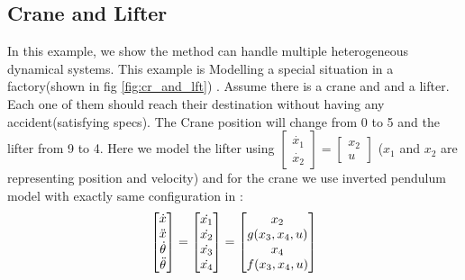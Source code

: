 \subsection{Crane and Lifter}
In this example, we show the method can handle multiple heterogeneous dynamical systems. This example is Modelling a special situation in a factory(shown in fig \ref{fig:cr_and_lft}) . Assume there is a crane and and a lifter. Each one of them should reach their destination without having any accident(satisfying specs). The Crane position will change from 0 to 5 and the lifter from 9 to 4.  Here we model the lifter using $\begin{bmatrix} \dot{x_1}\\ \dot{x_2} \end{bmatrix}=\begin{bmatrix} x_2\\ u \end{bmatrix}$ ($x_1$ and $x_2$ are representing position and velocity) and for the crane we use inverted pendulum model with exactly same configuration in \cite{barto1983neuronlike}: \\ 
\[\begin{bmatrix}
\dot{x}\\
\Ddot{x}\\
\dot{\theta}\\
\Ddot{\theta}
\end{bmatrix}=\begin{bmatrix}
\dot{x_1}\\
\dot{x_2}\\
\dot{x_3}\\
\dot{x_4}
\end{bmatrix}=\begin{bmatrix}
x_2\\
g(x_3,x_4,u)\\
x_4\\
f(x_3,x_4,u)\\
\end{bmatrix}\]

